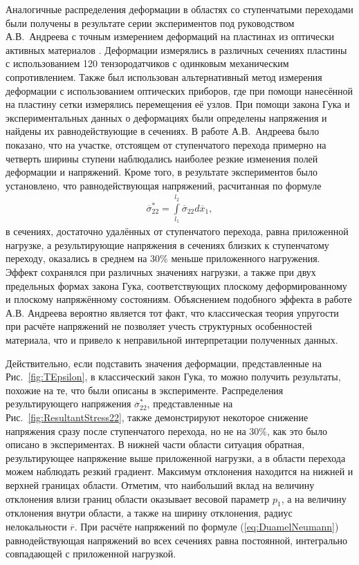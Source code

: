 Аналогичные распределения деформации в областях со ступенчатыми переходами были получены в результате серии экспериментов под руководством А.В.~Андреева с точным измерением деформаций на пластинах из оптически активных материалов \cite{Andreev}. Деформации измерялись в различных сечениях пластины с использованием 120 тензородатчиков с одинковым механическим сопротивлением. Также был использован альтернативный метод измерения деформации с использованием оптических приборов, где при помощи нанесённой на пластину сетки измерялись перемещения её узлов. При помощи закона Гука и экспериментальных данных о деформациях были определены напряжения и найдены их равнодействующие в сечениях. В работе А.В.~Андреева было показано, что на участке, отстоящем от ступенчатого перехода примерно на четверть ширины ступени наблюдались наиболее резкие изменения полей деформации и напряжений. Кроме того, в результате экспериментов было установлено, что равнодействующая напряжений, расчитанная по формуле
\begin{gather*}
	\overline{\sigma}_{22}^* = \int\limits_{l_1}^{l_2} \overline{\sigma}_{22} d \overline{x}_1,
\end{gather*}
в сечениях, достаточно удалённых от ступенчатого перехода, равна приложенной нагрузке, а результирующие напряжения в сечениях близких к ступенчатому переходу, оказались в среднем на 30\% меньше приложенного нагружения. Эффект сохранялся при различных значениях нагрузки, а также при двух предельных формах закона Гука, соответствующих плоскому деформированному и плоскому напряжённому состояниям. Объяснением подобного эффекта в работе А.В. Андреева вероятно является тот факт, что классическая теория упругости при расчёте напряжений не позволяет учесть структурных особенностей материала, что и привело к неправильной интерпретации полученных данных.

Действительно, если подставить значения деформации, представленные на Рис.~\ref{fig:TEpsilon}, в классический закон Гука, то можно получить результаты, похожие на те, что были описаны в эксперименте. Распределения результирующего напряжения $\overline{\sigma}_{22}^*$, представленные на Рис.~\ref{fig:ResultantStress22}, также демонстрируют некоторое снижение напряжения сразу после ступенчатого перехода, но не на 30\%, как это было описано в экспериментах. В нижней части области ситуация обратная, результирующее напряжение выше приложенной нагрузки, а в области перехода можем наблюдать резкий градиент. Максимум отклонения находится на нижней и верхней границах области. Отметим, что наибольший вклад на величину отклонения влизи границ области оказывает весовой параметр $p_1$, а на величину отклонения внутри области, а также на ширину отклонения, радиус нелокальности $\overline{r}$. При расчёте напряжений по формуле (\ref{eq:DuamelNeumann}) равнодействующая напряжений во всех сечениях равна постоянной, интегрально совпадающей с приложенной нагрузкой.

